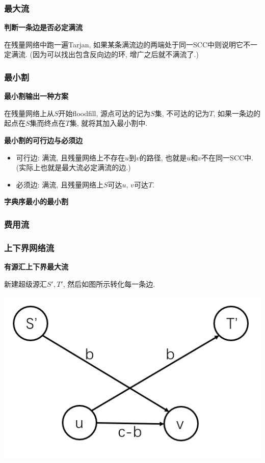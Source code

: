 \subsubsection{最大流}

\textbf{判断一条边是否必定满流}

在残量网络中跑一遍Tarjan, 如果某条满流边的两端处于同一SCC中则说明它不一定满流. (因为可以找出包含反向边的环, 增广之后就不满流了.)

\subsubsection{最小割}

\textbf{最小割输出一种方案}

在残量网络上从$S$开始floodfill, 源点可达的记为$S$集, 不可达的记为$T$, 如果一条边的起点在$S$集而终点在$T$集, 就将其加入最小割中.

\textbf{最小割的可行边与必须边}

\begin{itemize}
	\item 可行边: 满流, 且残量网络上不存在$u$到$v$的路径, 也就是$u$和$v$不在同一SCC中. (实际上也就是最大流必定满流的边.)

	\item 必须边: 满流, 且残量网络上$S$可达$u$, $v$可达$T$.
\end{itemize}

\textbf{字典序最小的最小割}

\subsubsection{费用流}


\subsubsection{上下界网络流}

\textbf{有源汇上下界最大流}

新建超级源汇$S', T'$, 然后如图所示转化每一条边.

\includegraphics[scale = 0.5]{../src/graph/上下界网络流.png}

